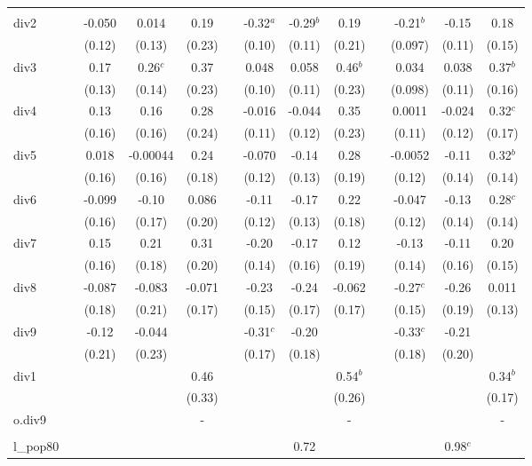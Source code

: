 \documentclass[]{article}
\begin{document}
\begin{tabular}{lcccccccccccc}
 &  &  &  &  &  &  &  &  &  &  &  &  \\
div2 &  & -0.050 & 0.014 & 0.19 &  & -0.32$^a$ & -0.29$^b$ & 0.19 &  & -0.21$^b$ & -0.15 & 0.18 \\
 &  & (0.12) & (0.13) & (0.23) &  & (0.10) & (0.11) & (0.21) &  & (0.097) & (0.11) & (0.15) \\
div3 &  & 0.17 & 0.26$^c$ & 0.37 &  & 0.048 & 0.058 & 0.46$^b$ &  & 0.034 & 0.038 & 0.37$^b$ \\
 &  & (0.13) & (0.14) & (0.23) &  & (0.10) & (0.11) & (0.23) &  & (0.098) & (0.11) & (0.16) \\
div4 &  & 0.13 & 0.16 & 0.28 &  & -0.016 & -0.044 & 0.35 &  & 0.0011 & -0.024 & 0.32$^c$ \\
 &  & (0.16) & (0.16) & (0.24) &  & (0.11) & (0.12) & (0.23) &  & (0.11) & (0.12) & (0.17) \\
div5 &  & 0.018 & -0.00044 & 0.24 &  & -0.070 & -0.14 & 0.28 &  & -0.0052 & -0.11 & 0.32$^b$ \\
 &  & (0.16) & (0.16) & (0.18) &  & (0.12) & (0.13) & (0.19) &  & (0.12) & (0.14) & (0.14) \\
div6 &  & -0.099 & -0.10 & 0.086 &  & -0.11 & -0.17 & 0.22 &  & -0.047 & -0.13 & 0.28$^c$ \\
 &  & (0.16) & (0.17) & (0.20) &  & (0.12) & (0.13) & (0.18) &  & (0.12) & (0.14) & (0.14) \\
div7 &  & 0.15 & 0.21 & 0.31 &  & -0.20 & -0.17 & 0.12 &  & -0.13 & -0.11 & 0.20 \\
 &  & (0.16) & (0.18) & (0.20) &  & (0.14) & (0.16) & (0.19) &  & (0.14) & (0.16) & (0.15) \\
div8 &  & -0.087 & -0.083 & -0.071 &  & -0.23 & -0.24 & -0.062 &  & -0.27$^c$ & -0.26 & 0.011 \\
 &  & (0.18) & (0.21) & (0.17) &  & (0.15) & (0.17) & (0.17) &  & (0.15) & (0.19) & (0.13) \\
div9 &  & -0.12 & -0.044 &  &  & -0.31$^c$ & -0.20 &  &  & -0.33$^c$ & -0.21 &  \\
 &  & (0.21) & (0.23) &  &  & (0.17) & (0.18) &  &  & (0.18) & (0.20) &  \\
div1 &  &  &  & 0.46 &  &  &  & 0.54$^b$ &  &  &  & 0.34$^b$ \\
 &  &  &  & (0.33) &  &  &  & (0.26) &  &  &  & (0.17) \\
o.div9 &  &  &  & - &  &  &  & - &  &  &  & - \\
 &  &  &  &  &  &  &  &  &  &  &  &  \\
l\_pop80 &  &  &  &  &  &  & 0.72 &  &  &  & 0.98$^c$ &  \\

\end{tabular}
\end{document}
